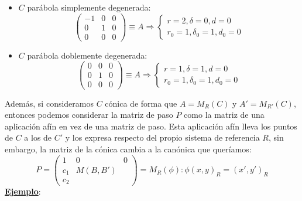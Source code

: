 \documentclass[10pt,a4paper,openright]{book}
\theoremstyle{break}
\begin{document}
\begin{itemize}
$$\begin{array}{c|cc}
0 & 0 & \frac{-1}{2} \\
\hline
0 & 1  & 0  \\
\frac{-1}{2} &  0 & 0
\end{array}
\right) \equiv A \Rightarrow \begin{cases} r= 3 , \delta = 1, d < 0 \\ r_0 = 1, \delta_0 = 1, d_0 = 0 \end{cases}$$
\item $C$ parábola simplemente degenerada:
$$\left(\begin{array}{c|cc}
-1 & 0 & 0 \\
\hline
0 & 1  & 0  \\
0 &  0 & 0
\end{array}
\right) \equiv A \Rightarrow \begin{cases} r= 2 , \delta = 0, d = 0 \\ r_0 = 1, \delta_0 = 1, d_0 = 0 \end{cases}$$
\item $C$ parábola doblemente degenerada:
$$\left(\begin{array}{c|cc}
0 & 0 & 0 \\
\hline
0 & 1  & 0  \\
0 &  0 & 0
\end{array}
\right) \equiv A \Rightarrow \begin{cases} r= 1, \delta = 1, d = 0 \\ r_0 = 1, \delta_0 = 1, d_0 = 0 \end{cases}$$
\end{itemize}
Además, si consideramos $C$ cónica de forma que $A = M_R (C)$ y $A' = M_{R'} (C)$, entonces podemos considerar la matriz de paso $P$ como la matriz de una aplicación afín en vez de una matriz de paso. Esta aplicación afín lleva los puntos de $C$ a los de $C'$ y los expresa respecto del propio sistema de referencia $R$, sin embargo, la matriz de la cónica cambia a la canónica que queríamos:
$$P=\left(\begin{array}{c|cc}
1 & 0 & 0 \\
\hline
c_1 & M(B, B')  &   \\
c_2 &  &
\end{array}
\right) = M_R (\phi) : \phi (x,y)_R = (x', y')_R $$
\underline{\textbf{Ejemplo}}:
\end{document}
